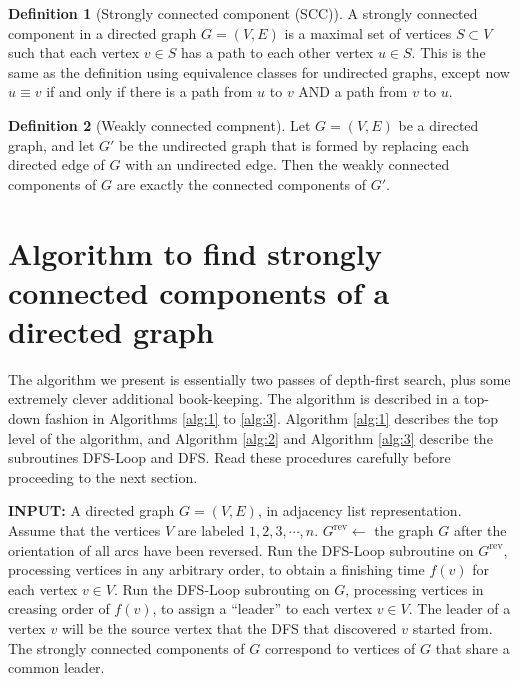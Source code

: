 \documentclass [12pt]{article}
\theoremstyle{definition}
\newtheorem{definition}{Definition}[section]
\begin{document}
\begin{definition}[Strongly connected component (SCC)]
A strongly connected component in a directed graph $G = (V, E)$ is a maximal set of vertices $S \subset V$ such that each vertex $v \in S$ has a path to each other vertex $u \in S$. This is the same as the definition using equivalence classes for undirected graphs, except now $u \equiv v$ if and only if there is a path from $u$ to $v$ AND a path from $v$ to $u$.
\end{definition}

\begin{definition}[Weakly connected compnent]
Let $G = (V, E)$ be a directed graph, and let $G'$ be the undirected graph that is formed by replacing each directed edge of $G$ with an undirected edge. Then the weakly connected components of $G$ are exactly the connected components of $G'$.
\end{definition}

\section{Algorithm to find strongly connected components of a directed graph}

The algorithm we present is essentially two passes of depth-first search, plus some extremely clever additional book-keeping. The algorithm is described in a top-down fashion in Algorithms \ref{alg:1} to \ref{alg:3}. Algorithm \ref{alg:1} describes the top level of the algorithm, and Algorithm \ref{alg:2} and Algorithm \ref{alg:3} describe the subroutines DFS-Loop and DFS. Read these procedures carefully before proceeding to the next section.

\begin{algorithm}
\caption{The top level of our SCC algorithm. The $f$-values and leaders are computed in the first and second calls to DFS-Loop, respectively (see below)}
\label{alg:1}
\begin{algorithmic}
\STATE \textbf{INPUT:} A directed graph $G = (V,E)$, in adjacency list representation. Assume that the vertices $V$ are labeled $1, 2, 3, \cdots, n$.
\STATE $G^{\text{rev}} \gets$ the graph $G$ after the orientation of all arcs have been reversed.
\STATE Run the DFS-Loop subroutine on $G^{\text{rev}}$, processing vertices in any arbitrary order, to obtain a finishing time $f(v)$ for each vertex $v \in V$.
\STATE Run the DFS-Loop subrouting on $G$, processing vertices in creasing order of $f(v)$, to assign a ``leader'' to each vertex $v \in V$. The leader of a vertex $v$ will be the source vertex that the DFS that discovered $v$ started from.
\STATE The strongly connected components of $G$ correspond to vertices of $G$ that share a common leader.
\end{algorithmic}
\end{algorithm}
\end{document}

